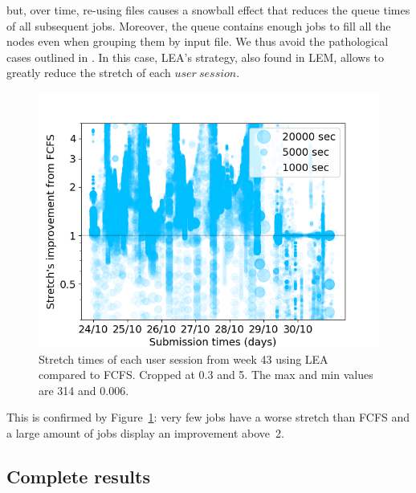 \documentclass[sigconf,review,anonymous]{acmart}
\newcommand{\rev}[1]{{\color{blue}{#1}}}
\newcommand{\us}{\ensuremath{\mathit{user~session}}\xspace}
\begin{document}
but, over time, re-using files causes a snowball effect that reduces the
queue times of all subsequent jobs.
Moreover, the queue contains enough jobs to fill all the nodes even when grouping them by input file.
We thus avoid the pathological cases outlined in \rev{Section~\ref{sec.40}}.
In this case, LEA's strategy, also found in LEM, allows to greatly reduce the stretch of each \us.
\begin{figure}[t]\centering\includegraphics[width=0.9\linewidth]{../MBSS/plot/Stretch_times/Stretch_times_FCFS_LEA_2022-10-24->2022-10-30_V10000_anonymous_450_128_32_256_4_1024.png}\caption{Stretch times of each user session from week 43 using LEA compared to FCFS. Cropped at 0.3 and 5. The max and min values are 314 and 0.006.}\label{vs_fcfs_lea_43}\end{figure}
This is confirmed by Figure~\ref{vs_fcfs_lea_43}: very few jobs 
have a worse stretch than FCFS and a large amount of jobs display an improvement above~2.


\subsection{Complete results}
\end{document}
